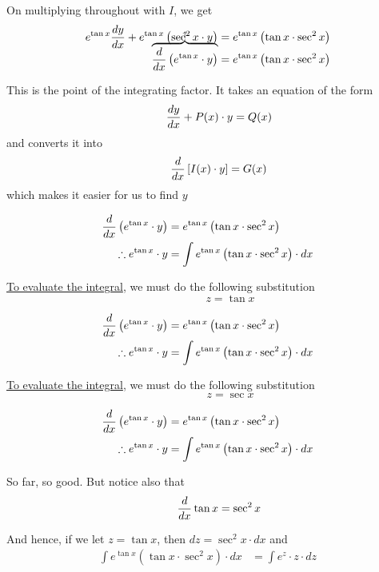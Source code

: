 \documentclass[14pt,fleqn]{extarticle}
\newcommand\intgf{e^{\tan x}}
\newcommand\expa{\tan x\cdot\sec^2 x}
\begin{document}
\begin{problem}
\begin{step}
On multiplying throughout with $I$, we get 
\smallmath\begin{align}
\intgf \dydx + \intgf \left(\sec^2x \cdot y \right) &= \intgf \left(\expa \right) \\[-20pt]
\overbrace{\ddx \left(\intgf\cdot y \right)}^{\uparrow} &= \intgf \left(\expa \right)
\end{align}

This is the point of the integrating factor. It takes an equation of the form 
\[ \qquad \frac{dy}{dx} + P(x)\cdot y = Q(x) \]
and converts it into 
\[ \qquad \frac{d}{dx} \left[I(x)\cdot y \right] = G(x) \]
which makes it easier for us to find $y$ 
\end{step}

\begin{step}
  \begin{options} 
     \correct 
       
       \begin{align}
	\ddx \left(\intgf \cdot y \right) &= \intgf \left(\expa \right) \\
	\therefore \intgf\cdot y &= \int \intgf \left(\expa \right)\cdot dx 
\end{align}

\underline{To evaluate the integral}, we must do the following substitution 
\[ \qquad \qquad z = \tan x \]

     \incorrect
     
     \begin{align}
	\ddx \left(\intgf \cdot y \right) &= \intgf \left(\expa \right) \\
	\therefore \intgf\cdot y &= \int \intgf \left(\expa \right)\cdot dx 
\end{align}

\underline{To evaluate the integral}, we must do the following substitution 
\[ \qquad \qquad z = \sec x \]
        
    \end{options} 
     \reason 
     
     \begin{align}
	\ddx \left(\intgf \cdot y \right) &= \intgf \left(\expa \right) \\
	\therefore \intgf\cdot y &= \int \intgf \left(\expa \right)\cdot dx 
\end{align}

So far, so good. But notice also that 
\[ \qquad \frac{d}{dx} \tan x = \sec^2 x\]

And hence, if we let $z = \tan x$, then $dz = \sec^2x\cdot dx$ and 
\begin{align}
\int \intgf \left(\expa \right)\cdot dx &= \int e^z\cdot z \cdot dz 
\end{align}
       

\end{step}
\end{problem}
\end{document}
